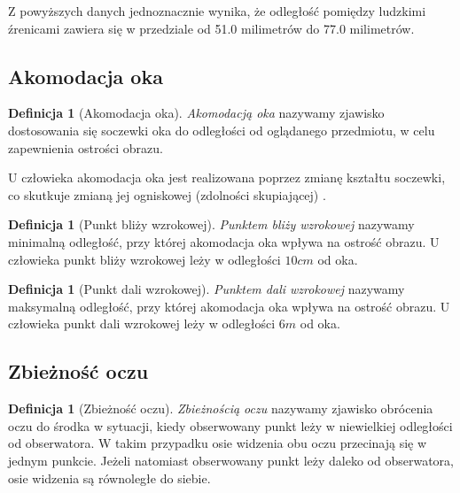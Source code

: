 \documentclass[a4paper,11pt,twoside]{report}
\theoremstyle{definition}
\newtheorem{definition}[theorem]{Definicja}
\begin{document}
Z powyższych danych jednoznacznie wynika, że odległość pomiędzy ludzkimi źrenicami zawiera się w przedziale od 51.0 milimetrów do 77.0 milimetrów.

\subsection{Akomodacja oka}

\begin{definition}[Akomodacja oka]
\textit{Akomodacją oka} nazywamy zjawisko dostosowania się soczewki oka do odległości od oglądanego przedmiotu, w celu zapewnienia ostrości obrazu.
\end{definition}

U człowieka akomodacja oka jest realizowana poprzez zmianę kształtu soczewki, co skutkuje zmianą jej ogniskowej (zdolności skupiającej) \cite{eyeAccomodation}.

\begin{definition}[Punkt bliży wzrokowej]
\textit{Punktem bliży wzrokowej} nazywamy minimalną odległość, przy której akomodacja oka wpływa na ostrość obrazu. U człowieka punkt bliży wzrokowej leży w odległości $10 cm$ od oka.
\end{definition}

\begin{definition}[Punkt dali wzrokowej]
\textit{Punktem dali wzrokowej} nazywamy maksymalną odległość, przy której akomodacja oka wpływa na ostrość obrazu. U człowieka punkt dali wzrokowej leży w odległości $6 m$ od oka.
\end{definition}

\subsection{Zbieżność oczu}

\begin{definition}[Zbieżność oczu]
\textit{Zbieżnością oczu} nazywamy zjawisko obrócenia oczu do środka w sytuacji, kiedy obserwowany punkt leży w niewielkiej odległości od obserwatora. W takim przypadku osie widzenia obu oczu przecinają się w jednym punkcie. Jeżeli natomiast obserwowany punkt leży daleko od obserwatora, osie widzenia są równoległe do siebie.\cite{eyeConvergence}
\end{definition}
\end{document}
